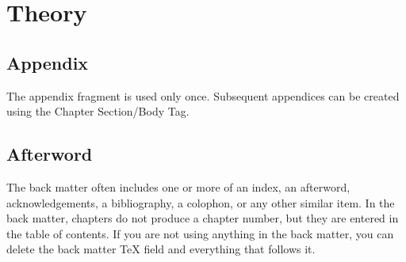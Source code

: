 \documentclass{book}
\begin{document}
%

%

\part{Theory}

%

\bigskip

\appendix

\chapter{Appendix}

The appendix fragment is used only once. Subsequent appendices can be
created using the Chapter Section/Body Tag.

\backmatter

\chapter{Afterword}

The back matter often includes one or more of an index, an afterword,
acknowledgements, a bibliography, a colophon, or any other similar item. In
the back matter, chapters do not produce a chapter number, but they are
entered in the table of contents. If you are not using anything in the back
matter, you can delete the back matter TeX field and everything that follows
it.
\end{document}
